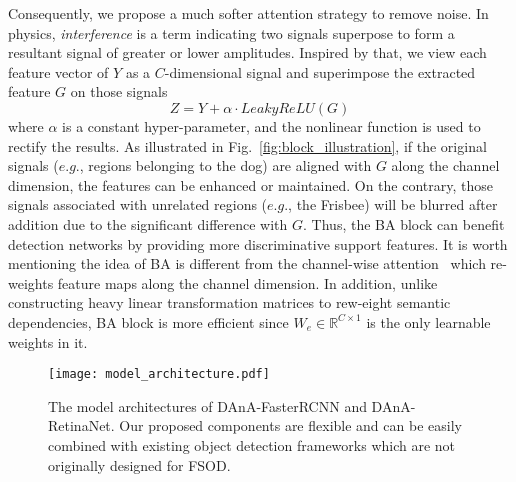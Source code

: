 \documentclass[journal]{IEEEtran}
\begin{document}
Consequently, we propose a much softer attention strategy to remove noise.
In physics, \textit{interference} is a term indicating two signals superpose to form a resultant signal of greater or lower amplitudes.
Inspired by that, we view each feature vector of $Y$ as a $C$-dimensional signal and superimpose the extracted feature $G$ on those signals
\begin{equation} \label{eq:enhancement_in_SE}
    Z = Y + \alpha \cdot LeakyReLU (G)
\end{equation}
where $\alpha$ is a constant hyper-parameter, and the nonlinear function is used to rectify the results.
As illustrated in Fig.~\ref{fig:block_illustration}, if the original signals ($e.g.$, regions belonging to the dog) are aligned with $G$ along the channel dimension, the features can be enhanced or maintained.
On the contrary, those signals associated with unrelated regions ($e.g.$, the Frisbee) will be blurred after addition due to the significant difference with $G$.
Thus, the BA block can benefit detection networks by providing more discriminative support features.
It is worth mentioning the idea of BA is different from the channel-wise attention~\cite{hu2018squeeze, fu2019dual} which re-weights feature maps along the channel dimension.
In addition, unlike \cite{cao2019gcnet} constructing heavy linear transformation matrices to rew-eight semantic dependencies, BA block is more efficient since $W_e\in\mathbb{R}^{C\times 1}$ is the only learnable weights in it. 



\begin{figure}[t]
    \centering
    \texttt{[image: model\_architecture.pdf]}
    \caption{The model architectures of DAnA-FasterRCNN and DAnA-RetinaNet. Our proposed components are flexible and can be easily combined with existing object detection frameworks which are not originally designed for FSOD.
    }
    \label{fig:architecture}
\end{figure}
\end{document}
